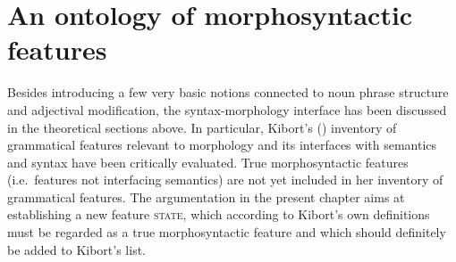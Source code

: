 \section{An ontology of morphosyntactic features}
Besides introducing a few very basic notions connected to noun phrase structure and adjectival modification, the syntax-morphology interface has been discussed in the theoretical sections above. In particular, Kibort's (\citeyear{kibort2010a}) inventory of grammatical features relevant to morphology and its interfaces with semantics and syntax have been critically evaluated. True morphosyntactic features (i.e.~features not interfacing semantics) are not yet included in her inventory of grammatical features. The argumentation in the present chapter aims at establishing a new feature \textsc{state}, which according to Kibort's own definitions must be regarded as a true morphosyntactic feature and which should definitely be added to Kibort's list. 

